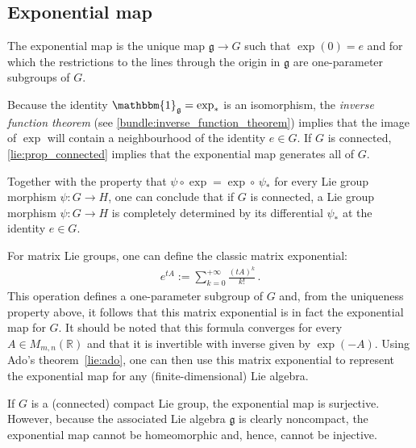 \subsection{Exponential map}


    \begin{property}[Uniqueness]
        The exponential map is the unique map $\mathfrak{g}\rightarrow G$ such that $\exp(0) = e$ and for which the restrictions to the lines through the origin in $\mathfrak{g}$ are one-parameter subgroups of $G$.
    \end{property}
    \begin{result}\label{lie:exp_result}
        Because the identity $\mathbbm{1}_{\mathfrak{g}}=\exp_\ast$ is an isomorphism, the \textit{inverse function theorem} (see \cref{bundle:inverse_function_theorem}) implies that the image of $\exp$ will contain a neighbourhood of the identity $e\in G$. If $G$ is connected, \cref{lie:prop_connected} implies that the exponential map generates all of $G$.

        Together with the property that $\psi\circ\exp = \exp\circ\,\psi_\ast$ for every Lie group morphism $\psi:G\rightarrow H$, one can conclude that if $G$ is connected, a Lie group morphism $\psi:G\rightarrow H$ is completely determined by its differential $\psi_\ast$ at the identity $e\in G$.
    \end{result}

    \begin{example}
        For matrix Lie groups, one can define the classic matrix exponential:
        \begin{gather}
            e^{tA} := \sum_{k=0}^{+\infty}\frac{(tA)^k}{k!}\,.
        \end{gather}
        This operation defines a one-parameter subgroup of $G$ and, from the uniqueness property above, it follows that this matrix exponential is in fact the exponential map for $G$. It should be noted that this formula converges for every $A\in M_{m,n}(\mathbb{R})$ and that it is invertible with inverse given by $\exp(-A)$. Using Ado's theorem~\ref{lie:ado}, one can then use this matrix exponential to represent the exponential map for any (finite-dimensional) Lie algebra.
    \end{example}
    \begin{remark}
        If $G$ is a (connected) compact Lie group, the exponential map is surjective. However, because the associated Lie algebra $\mathfrak{g}$ is clearly noncompact, the exponential map cannot be homeomorphic and, hence, cannot be injective.
    \end{remark}

